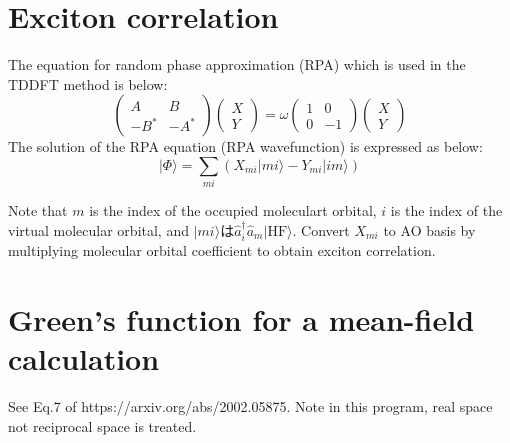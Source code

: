 \documentclass{article}
\begin{document}
\section{Exciton correlation}
The equation for random phase approximation (RPA) which is used in the TDDFT method is below:
\begin{equation}
\begin{pmatrix}
A & B \\
-B^* & -A^*
\end{pmatrix}
\begin{pmatrix}
X \\
Y
\end{pmatrix}
= \omega
\begin{pmatrix}
1 & 0 \\
0 & -1
\end{pmatrix}
\begin{pmatrix}
X \\
Y
\end{pmatrix}
\end{equation}
The solution of the RPA equation (RPA wavefunction) is expressed as below:
\begin{equation}
|\Phi \rangle = \sum_{mi} (X_{mi}|mi\rangle - Y_{mi}|im\rangle)
\end{equation}

Note that $m$ is the index of the occupied moleculart orbital, $i$ is the index of the virtual molecular orbital,
and $|mi\rangle$は$\hat{a}^{\dagger}_{i}\hat{a}_{m}|\mathrm{HF}\rangle$.
Convert $X_{mi}$ to AO basis by multiplying molecular orbital coefficient to obtain exciton correlation.

\section{Green's function for a mean-field calculation}
 See Eq.7 of https://arxiv.org/abs/2002.05875.
 Note in this program, real space not reciprocal space is treated.
\end{document}
